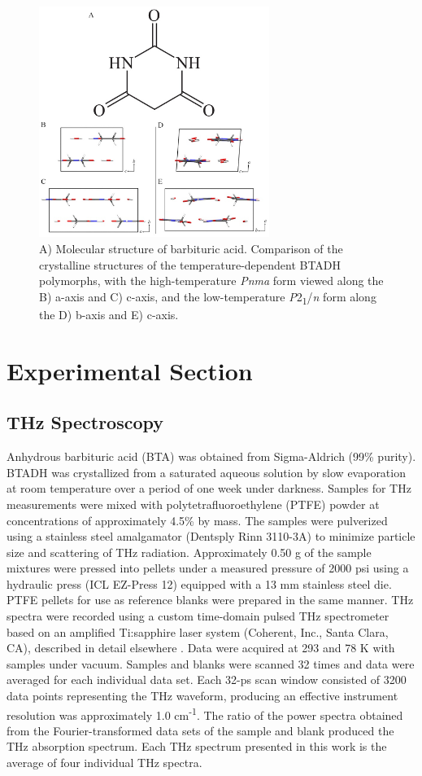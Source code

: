 \begin{figure}[ht]
  \center
  \includegraphics[width=7.5cm]{src/figures/btadh_figs/btadh_fig1.png}
  \caption{A) Molecular structure of barbituric acid. Comparison of the crystalline structures of the temperature-dependent BTADH polymorphs, with the high-temperature \textit{Pnma} form viewed along the B) a-axis and C) c-axis, and the low-temperature \textit{P}2\textsubscript{1}/\textit{n} form along the D) b-axis and E) c-axis.}
  \label{BTADH_fig}
\end{figure}


\section{\nobreak Experimental Section}
\subsection{THz Spectroscopy}
Anhydrous barbituric acid (BTA) was obtained from Sigma-Aldrich (99\% purity). BTADH was crystallized from a saturated aqueous solution by slow evaporation at room temperature over a period of one week under darkness. Samples for THz measurements were mixed with polytetrafluoroethylene (PTFE) powder at concentrations of approximately 4.5\% by mass. The samples were pulverized using a stainless steel amalgamator (Dentsply Rinn 3110-3A) to minimize particle size and scattering of THz radiation. Approximately 0.50 g of the sample mixtures were pressed into pellets under a measured pressure of 2000 psi using a hydraulic press (ICL EZ-Press 12) equipped with a 13 mm stainless steel die. PTFE pellets for use as reference blanks were prepared in the same manner. THz spectra were recorded using a custom time-domain pulsed THz spectrometer based on an amplified Ti:sapphire laser system (Coherent, Inc., Santa Clara, CA), described in detail elsewhere \citep{rexrode_effects_2019}. Data were acquired at 293 and 78 K with samples under vacuum. Samples and blanks were scanned 32 times and data were averaged for each individual data set. Each 32-ps scan window consisted of 3200 data points representing the THz waveform, producing an effective instrument resolution was approximately 1.0 cm\textsuperscript{-1}. The ratio of the power spectra obtained from the Fourier-transformed data sets of the sample and blank produced the THz absorption spectrum. Each THz spectrum presented in this work is the average of four individual THz spectra.

